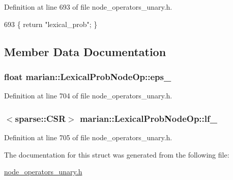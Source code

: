 Definition at line 693 of file node\+\_\+operators\+\_\+unary.\+h.


\begin{DoxyCode}
693 \{ \textcolor{keywordflow}{return} \textcolor{stringliteral}{"lexical\_prob"}; \}
\end{DoxyCode}


\subsection{Member Data Documentation}
\subsubsection[{\texorpdfstring{eps\+\_\+}{eps_}}]{\setlength{\rightskip}{0pt plus 5cm}float marian\+::\+Lexical\+Prob\+Node\+Op\+::eps\+\_\+}\hypertarget{structmarian_1_1LexicalProbNodeOp_a4ba3fd4673c37e3f791eb0e6880e0b10}{}\label{structmarian_1_1LexicalProbNodeOp_a4ba3fd4673c37e3f791eb0e6880e0b10}


Definition at line 704 of file node\+\_\+operators\+\_\+unary.\+h.

\subsubsection[{\texorpdfstring{lf\+\_\+}{lf_}}]{$<${\bf sparse\+::\+C\+SR}$>$ marian\+::\+Lexical\+Prob\+Node\+Op\+::lf\+\_\+}\hypertarget{structmarian_1_1LexicalProbNodeOp_a138b28948628890606c40eda04ab8f5e}{}\label{structmarian_1_1LexicalProbNodeOp_a138b28948628890606c40eda04ab8f5e}


Definition at line 705 of file node\+\_\+operators\+\_\+unary.\+h.



The documentation for this struct was generated from the following file\+:\begin{DoxyCompactItemize}
\item 
\hyperlink{node__operators__unary_8h}{node\+\_\+operators\+\_\+unary.\+h}\end{DoxyCompactItemize}
